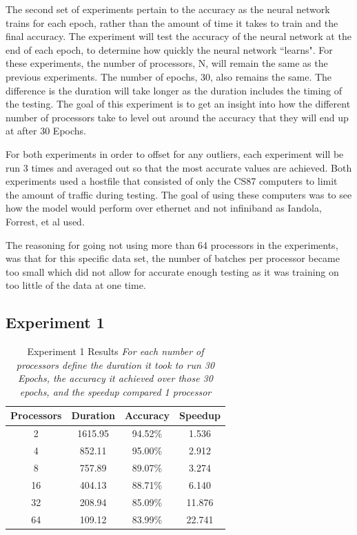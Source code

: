\documentclass[11pt,twocolumn]{article}
\begin{document}
The second set of experiments pertain to the accuracy as the neural network trains for each epoch, rather than the amount of time it takes to train and the final accuracy. The experiment will test the accuracy of the neural network at the end of each epoch, to determine how quickly the neural network ``learns". For these experiments, the number of processors, N, will remain the same as the previous experiments. The number of epochs, 30, also remains the same. The difference is the duration will take longer as the duration includes the timing of the testing. The goal of this experiment is to get an insight into how the different number of processors take to level out around the accuracy that they will end up at after 30 Epochs. 

For both experiments in order to offset for any outliers, each experiment will be run 3 times and averaged out so that the most accurate values are achieved. Both experiments used a hostfile that consisted of only the CS87 computers to limit the amount of traffic during testing. The goal of using these computers was to see how the model would perform over ethernet and not infiniband as Iandola, Forrest, et al \cite{iandola2016firecaffe} used.

The reasoning for going not using more than 64 processors in the experiments, was that for this specific data set, the number of batches per processor became too small which did not allow for accurate enough testing as it was training on too little of the data at one time. 


\subsection{Experiment 1} \label{impleres}

\begin{table}
\begin{center}
\begin{tabular}{|c|c|c|c|}
\hline
\multicolumn{1}{|c|}{Processors}  &\multicolumn{1}{c|}{Duration} &\multicolumn{1}{c|}{Accuracy} &\multicolumn{1}{c|}{Speedup} \\
\hline
2 & 1615.95 & 94.52\% & 1.536 \\
4 & 852.11 & 95.00\% & 2.912\\
8 & 757.89 & 89.07\% & 3.274\\
16 & 404.13 & 88.71\% & 6.140\\
32 & 208.94 & 85.09\% & 11.876\\
64 & 109.12 & 83.99\% & 22.741\\

\hline
\end{tabular}
\caption{\label{exp1res} Experiment 1 Results
  {\em For each number of processors define the duration it took to run 30 Epochs, the accuracy it achieved over those 30 epochs, and the speedup compared 1 processor}}
\end{center}
\end{table}
\end{document}

